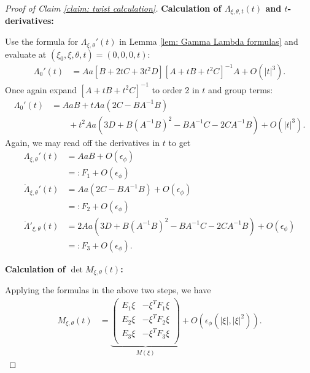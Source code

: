 \documentclass[10pt,a4paper]{amsart}
\begin{document}
\begin{proof}[Proof of Claim \ref{claim: twist calculation}]
    \noindent \textbf{Calculation of $\Lambda_{\xi,\theta,t}(t)$ and $t$-derivatives:}

    Use the formula for $\Lambda_{\xi,\theta}'(t)$ in Lemma \ref{lem: Gamma Lambda formulas} and evaluate at $(\xi_0,\xi,\theta,t) = (0,0,0,t)$: 
    \begin{align}
        \Lambda_{0}'(t) &= Aa[B + 2tC + 3t^2 D][A + tB + t^2 C]^{-1} A + O(|t|^3). 
    \end{align}
    Once again expand $[A + tB  +t^2 C]^{-1}$ to order 2 in $t$ and group terms: 
    \begin{align}
        \Lambda_{0}'(t) &= AaB + tAa(2C - BA^{-1}B) \\&\qquad + t^2Aa(3D + B(A^{-1} B)^2 - BA^{-1} C - 2CA^{-1} B) + O(|t|^3).\nonumber
    \end{align}
    Again, we may read off the derivatives in $t$ to get 
    \begin{align}
        \Lambda_{\xi,\theta}'(t) &= AaB + O(\epsilon_\phi) \\
        &=: F_1 + O(\epsilon_\phi) \\
        \dot \Lambda_{\xi,\theta}'(t) &= Aa(2C - BA^{-1}B) + O(\epsilon_\phi) \\
        &=: F_2 + O(\epsilon_\phi) \\
        \ddot \Lambda'_{\xi,\theta}(t) &= 2Aa(3D + B(A^{-1} B)^2 - BA^{-1} C - 2CA^{-1} B) + O(\epsilon_\phi)\\
        &=: F_3 + O(\epsilon_\phi).
    \end{align}

    \noindent \textbf{Calculation of $\det M_{\xi,\theta}(t)$:}
        
    Applying the formulas in the above two steps, we have 
    \begin{align}\label{eq: twist phi final expr}
        M_{\xi,\theta}(t) &= 
        \underbrace{
        \begin{pmatrix}
            E_1 \xi & -\xi^T F_1 \xi \\
            E_2 \xi & -\xi^T F_2 \xi \\
            E_3 \xi & -\xi^T F_3 \xi \\
        \end{pmatrix}}_{M(\xi)}
        + O(\epsilon_\phi(|\xi|, |\xi|^2)).
    \end{align}


\end{proof}
\end{document}
